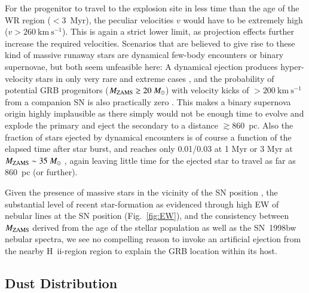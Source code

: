 \documentclass[traditabstract, referee]{aa}
\newcommand{\hii}{\mbox{H~{\sc ii}}}
\begin{document}
For the progenitor to travel to the explosion site in less time than the age of the WR region ($<3$~Myr), the peculiar velocities $v$ would have to be extremely high ($v>260~\mathrm{km~s^{-1}}$). This is again a strict lower limit, as projection effects further increase the required velocities. Scenarios that are believed to give rise to these kind of massive runaway stars are dynamical few-body encounters or binary supernovae, but both seem unfeasible here: A dynamical ejection produces hyper-velocity stars in only very rare and extreme cases \citep{2001A&A...365...49H, 2012ApJ...751..133P}, and the probability of potential GRB progenitors ($M_{\rm{ZAMS}}\gtrsim 20~M_\odot$) with velocity kicks of $>200~\mathrm{km~s^{-1}}$ from a companion SN is also practically zero \citep{2011MNRAS.414.3501E}. This makes a binary supernova origin highly implausible as there simply would not be enough time to evolve and explode the primary and eject the secondary to a distance $\gtrsim860$~pc. Also the fraction of stars ejected by dynamical encounters is of course a function of the elapsed time after star burst, and reaches only 0.01/0.03 at 1 Myr or 3 Myr at $M_{\rm{ZAMS}}\sim 35~M_\odot$ \citep{2012ApJ...746...15B}, again leaving little time for the ejected star to travel as far as 860~pc (or further).

Given the presence of massive stars in the vicinity of the SN position \citep{2000ApJ...542L..89F}, the substantial level of recent star-formation as evidenced through high EW of nebular lines at the SN position (Fig.~\ref{fig:EW}), and the consistency between $M_{\rm{ZAMS}}$ derived from the age of the stellar population as well as the SN~1998bw nebular spectra, we see no compelling reason to invoke an artificial ejection from the nearby \hii-region region to explain the GRB location within its host.

\subsection{Dust Distribution}
\end{document}
